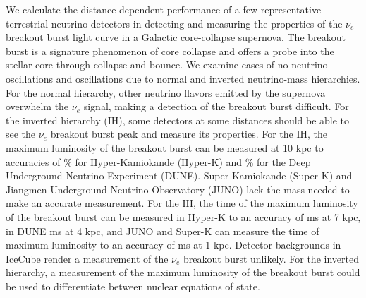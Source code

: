 We calculate the distance-dependent performance of a few representative terrestrial 
neutrino detectors in detecting and measuring the properties of the $\nu_e$
breakout 
burst light curve in a Galactic core-collapse supernova. The breakout 
burst is a signature phenomenon of core collapse and offers a probe
into 
the stellar core through collapse and bounce. We examine cases of 
no neutrino oscillations and oscillations due to normal and inverted 
neutrino-mass hierarchies. For the normal hierarchy, other neutrino 
flavors emitted by the supernova overwhelm the $\nu_e$ signal, making a 
detection of the breakout burst difficult. For the inverted hierarchy (IH), 
some detectors at some distances should be able to see the $\nu_e$ breakout 
burst peak and measure its properties. For the IH, the 
maximum luminosity of the breakout burst can be measured at 10 kpc to 
accuracies of \% for Hyper-Kamiokande (Hyper-K) and \%
for the Deep Underground Neutrino Experiment (DUNE). Super-Kamiokande
(Super-K) and Jiangmen Underground Neutrino Observatory (JUNO) lack 
the mass needed to make an accurate measurement. 
For the IH, 
the time of the maximum luminosity of the breakout burst can be
measured 
in Hyper-K to an accuracy of  ms at 7 kpc, in DUNE  ms at 4 kpc, 
and JUNO and Super-K can measure the time of maximum luminosity to 
an accuracy of  ms at 1 kpc. 
Detector backgrounds in IceCube render a measurement of the $\nu_e$
breakout burst unlikely.
For the inverted hierarchy, a 
measurement of the maximum luminosity of the breakout burst could 
be used to differentiate between nuclear equations of state. 
